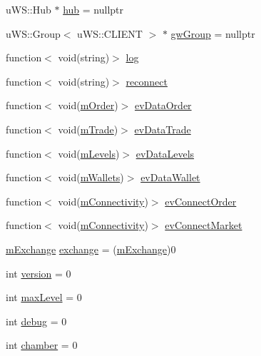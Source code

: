 \begin{DoxyCompactItemize}
\item 
u\+W\+S\+::\+Hub $\ast$ \hyperlink{class_k_1_1_gw_a33b00844a7c4d5c91a4696d71e02bafd}{hub} = nullptr
\item 
u\+W\+S\+::\+Group$<$ u\+W\+S\+::\+C\+L\+I\+E\+NT $>$ $\ast$ \hyperlink{class_k_1_1_gw_a57ae195e4262e03d47cad44c3a0b09f1}{gw\+Group} = nullptr
\item 
function$<$ void(string)$>$ \hyperlink{class_k_1_1_gw_a45c045408bc39a1e18f99b18505a0859}{log}
\item 
function$<$ void(string)$>$ \hyperlink{class_k_1_1_gw_acedf7f89824adaf984f2ff0cbb29961a}{reconnect}
\item 
function$<$ void(\hyperlink{struct_k_1_1m_order}{m\+Order})$>$ \hyperlink{class_k_1_1_gw_adf1e832cf66132207c5b97edb28437bf}{ev\+Data\+Order}
\item 
function$<$ void(\hyperlink{struct_k_1_1m_trade}{m\+Trade})$>$ \hyperlink{class_k_1_1_gw_a6cdc51ebb4004f0a69afafb623d9d7e0}{ev\+Data\+Trade}
\item 
function$<$ void(\hyperlink{struct_k_1_1m_levels}{m\+Levels})$>$ \hyperlink{class_k_1_1_gw_a2d20ec3398210965d042521449f1d890}{ev\+Data\+Levels}
\item 
function$<$ void(\hyperlink{struct_k_1_1m_wallets}{m\+Wallets})$>$ \hyperlink{class_k_1_1_gw_ae539d2c47a0e797655fea7dcc8666408}{ev\+Data\+Wallet}
\item 
function$<$ void(\hyperlink{namespace_k_a3da250819294c55d5728586148bfa19e}{m\+Connectivity})$>$ \hyperlink{class_k_1_1_gw_a2a25d79475922457931affe36df2223f}{ev\+Connect\+Order}
\item 
function$<$ void(\hyperlink{namespace_k_a3da250819294c55d5728586148bfa19e}{m\+Connectivity})$>$ \hyperlink{class_k_1_1_gw_a9df19921d4fe9fc1aab360b9605fd451}{ev\+Connect\+Market}
\item 
\hyperlink{namespace_k_a7ab53d1849aa2c29d90459c21afa8c17}{m\+Exchange} \hyperlink{class_k_1_1_gw_ab20a118abdc21d41ee2c9a5ae01212db}{exchange} = (\hyperlink{namespace_k_a7ab53d1849aa2c29d90459c21afa8c17}{m\+Exchange})0
\item 
int \hyperlink{class_k_1_1_gw_aad880fc4455c253781e8968f2239d56f}{version} = 0
\item 
int \hyperlink{class_k_1_1_gw_a8811afa719f86cb7ddde8770eb580fdc}{max\+Level} = 0
\item 
int \hyperlink{class_k_1_1_gw_ac3e1795766a80ec63b157951b4b9a7d4}{debug} = 0
\item 
int \hyperlink{class_k_1_1_gw_a8eb87e9b99a80ee81ff9114f6241b8d4}{chamber} = 0

\end{DoxyCompactItemize}
